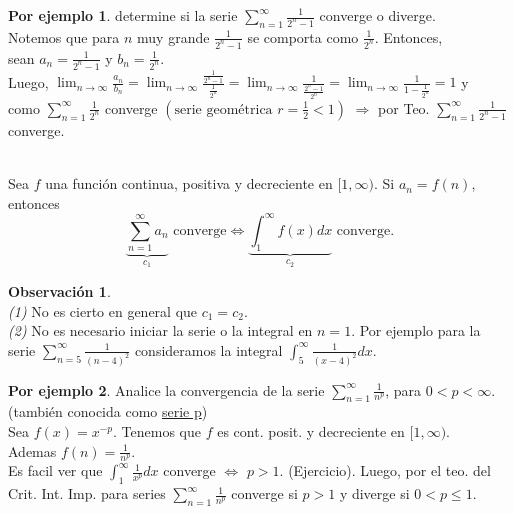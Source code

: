 \documentclass{article}
\theoremstyle{definition}
\theoremstyle{definition}
\newtheorem*{obs}{Observación}
\newtheorem*{ej}{Por ejemplo}
\theoremstyle{remark}
\begin{document}
\begin{ej}
  determine si la serie $\sum_{n=1}^{\infty}{\frac{1}{2^n-1}}$ converge o diverge. \\
  Notemos que para $n$ muy grande $\frac{1}{2^n-1}$ se comporta como $\frac{1}{2^n}$. Entonces, \\
  sean $a_n=\frac{1}{2^n-1}$ y $b_n=\frac{1}{2^n}$. \\
Luego, $\lim_{n\to\infty}{\frac{a_n}{b_n}}=\lim_{n\to\infty}{\frac{\frac{1}{2^n-1}}{\frac{1}{2^n}}}=\lim_{n\to\infty} {\frac{1}{\frac{2^n-1}{2^n}}}=\lim_{n\to\infty}{\frac{1}{1-\frac{1}{2^n}}}=1$ y \\
como $\sum_{n=1}^{\infty}{\frac{1}{2^n}}$ converge $\left(\text{serie geométrica } r=\frac{1}{2}<1\right)$ $\Rightarrow$ por Teo. $\sum_{n=1}^{\infty}{\frac{1}{2^n-1}}$ converge. 

\end{ej}

\pagebreak

\begin{teo} \; \\
  Sea $f$ una función continua, positiva y decreciente en $[1,\infty)$. Si $a_n=f(n)$, entonces 
  \[
    \underbrace{\sum_{n=1}^{\infty}{a_n}}_{c_1} \text{ converge} \Leftrightarrow \underbrace{\int_{1}^{\infty}{f(x)dx}}_{c_2} \text{ converge.}
  \]
\end{teo}

\begin{obs} \; \\
  \emph{(1)} No es cierto en general que $c_1=c_2$. \\
  \emph{(2)} No es necesario iniciar la serie o la integral en $n=1$. Por ejemplo para la serie $\sum_{n=5}^{\infty}{\frac{1}{(n-4)^2}}$ consideramos la integral $\int_{5}^{\infty}{\frac{1}{(x-4)^2}dx.}$
\end{obs}


\begin{ej}
Analice la convergencia de la serie $\sum_{n=1}^{\infty}{\frac{1}{n^p}}$, para $0<p<\infty$. (también conocida como \underline{serie p}) \\ 
Sea $f(x)=x^{-p}$. Tenemos que $f$ es cont. posit. y decreciente en $[1,\infty)$.\\
Ademas $f(n)=\frac{1}{n^p}$. \\
Es facil ver que $\int_{1}^\infty{\frac{1}{x^p}dx}$ converge $\Leftrightarrow$ $p>1$. (Ejercicio). Luego, por el teo. del Crit. Int. Imp. para series $\sum_{n=1}^{\infty}{\frac{1}{n^p}}$ converge si $p>1$ y diverge si $0<p\leq 1$.
\end{ej}
\end{document}
